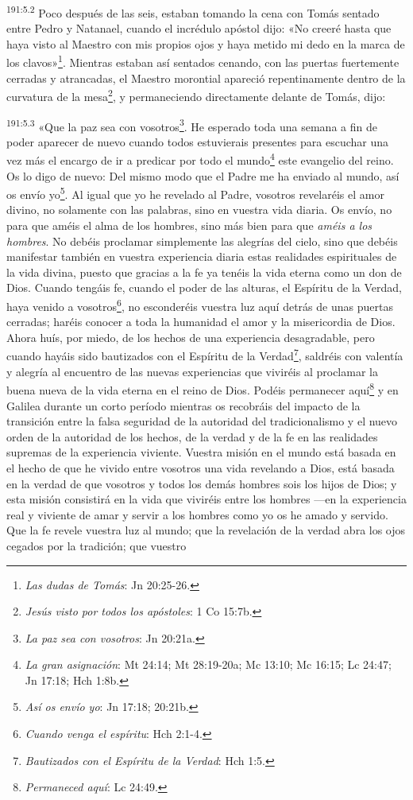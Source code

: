 \par 
\textsuperscript{191:5.2} Poco después de las seis, estaban tomando la cena con Tomás sentado entre Pedro y Natanael, cuando el incrédulo apóstol dijo: «No creeré hasta que haya visto al Maestro con mis propios ojos y haya metido mi dedo en la marca de los clavos»\footnote{\textit{Las dudas de Tomás}: Jn 20:25-26.}. Mientras estaban así sentados cenando, con las puertas fuertemente cerradas y atrancadas, el Maestro morontial apareció repentinamente dentro de la curvatura de la mesa\footnote{\textit{Jesús visto por todos los apóstoles}: 1 Co 15:7b.}, y permaneciendo directamente delante de Tomás, dijo:

\par 
\textsuperscript{191:5.3} «Que la paz sea con vosotros\footnote{\textit{La paz sea con vosotros}: Jn 20:21a.}. He esperado toda una semana a fin de poder aparecer de nuevo cuando todos estuvierais presentes para escuchar una vez más el encargo de ir a predicar por todo el mundo\footnote{\textit{La gran asignación}: Mt 24:14; Mt 28:19-20a; Mc 13:10; Mc 16:15; Lc 24:47; Jn 17:18; Hch 1:8b.} este evangelio del reino. Os lo digo de nuevo: Del mismo modo que el Padre me ha enviado al mundo, así os envío yo\footnote{\textit{Así os envío yo}: Jn 17:18; 20:21b.}. Al igual que yo he revelado al Padre, vosotros revelaréis el amor divino, no solamente con las palabras, sino en vuestra vida diaria. Os envío, no para que améis el alma de los hombres, sino más bien para que \textit{améis a los hombres}. No debéis proclamar simplemente las alegrías del cielo, sino que debéis manifestar también en vuestra experiencia diaria estas realidades espirituales de la vida divina, puesto que gracias a la fe ya tenéis la vida eterna como un don de Dios. Cuando tengáis fe, cuando el poder de las alturas, el Espíritu de la Verdad, haya venido a vosotros\footnote{\textit{Cuando venga el espíritu}: Hch 2:1-4.}, no esconderéis vuestra luz aquí detrás de unas puertas cerradas; haréis conocer a toda la humanidad el amor y la misericordia de Dios. Ahora huís, por miedo, de los hechos de una experiencia desagradable, pero cuando hayáis sido bautizados con el Espíritu de la Verdad\footnote{\textit{Bautizados con el Espíritu de la Verdad}: Hch 1:5.}, saldréis con valentía y alegría al encuentro de las nuevas experiencias que viviréis al proclamar la buena nueva de la vida eterna en el reino de Dios. Podéis permanecer aquí\footnote{\textit{Permaneced aquí}: Lc 24:49.} y en Galilea durante un corto período mientras os recobráis del impacto de la transición entre la falsa seguridad de la autoridad del tradicionalismo y el nuevo orden de la autoridad de los hechos, de la verdad y de la fe en las realidades supremas de la experiencia viviente. Vuestra misión en el mundo está basada en el hecho de que he vivido entre vosotros una vida revelando a Dios, está basada en la verdad de que vosotros y todos los demás hombres sois los hijos de Dios; y esta misión consistirá en la vida que viviréis entre los hombres ---en la experiencia real y viviente de amar y servir a los hombres como yo os he amado y servido. Que la fe revele vuestra luz al mundo; que la revelación de la verdad abra los ojos cegados por la tradición; que vuestro 